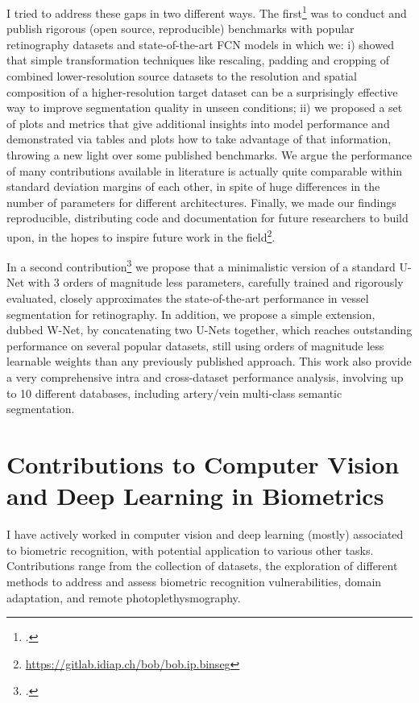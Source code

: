 \documentclass[a4paper,10pt,onecolumn]{article}
\begin{document}
I tried to address these gaps in two different ways.  The
first\footcite{arxiv-2019} was to conduct and publish rigorous (open source,
reproducible) benchmarks with popular retinography datasets and
state-of-the-art FCN models in which we: i) showed that simple transformation
techniques like rescaling, padding and cropping of combined lower-resolution
source datasets to the resolution and spatial composition of a
higher-resolution target dataset can be a surprisingly effective way to improve
segmentation quality in unseen conditions; ii) we proposed a set of plots and
metrics that give additional insights into model performance and demonstrated
via tables and plots how to take advantage of that information, throwing a new
light over some published benchmarks.  We argue the performance of many
contributions available in literature is actually quite comparable within
standard deviation margins of each other, in spite of huge differences in the
number of parameters for different architectures.  Finally, we made our
findings reproducible, distributing code and documentation for future
researchers to build upon, in the hopes to inspire future work in the
field\footnote{\url{https://gitlab.idiap.ch/bob/bob.ip.binseg}}.

In a second contribution\footcite{arxiv-2020} we propose that a minimalistic
version of a standard U-Net with 3 orders of magnitude less parameters,
carefully trained and rigorously evaluated, closely approximates the
state-of-the-art performance in vessel segmentation for retinography.  In
addition, we propose a simple extension, dubbed W-Net, by concatenating two
U-Nets together, which reaches outstanding performance on several popular
datasets, still using orders of magnitude less learnable weights than any
previously published approach.  This work also provide a very comprehensive
intra and cross-dataset performance analysis, involving up to 10 different
databases, including artery/vein multi-class semantic segmentation.

\section{Contributions to Computer Vision and Deep Learning in Biometrics}

I have actively worked in computer vision and deep learning (mostly) associated
to biometric recognition, with potential application to various other tasks.
Contributions range from the collection of datasets, the exploration of
different methods to address and assess biometric recognition vulnerabilities,
domain adaptation, and remote photoplethysmography.
\end{document}
